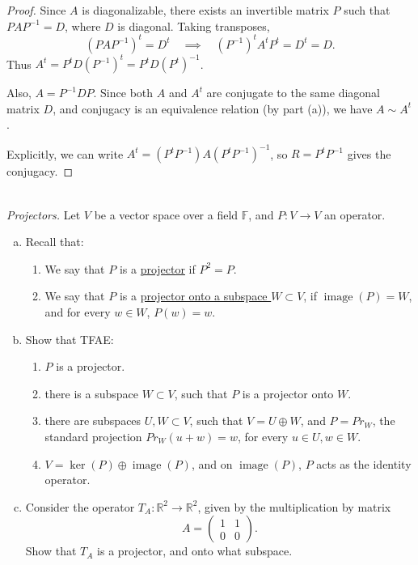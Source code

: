 \documentclass{article}
\def\rr{{\mathbb R}}
\begin{document}
\begin{enumerate}[(a)]
\begin{enumerate}[1.]
            \begin{proof}
                Since $A$ is diagonalizable, there exists an invertible matrix $P$ such that $P A P^{-1} = D$, where $D$ is diagonal. Taking transposes,
                \[
                    (P A P^{-1})^t = D^t \quad \implies \quad (P^{-1})^t A^t P^t = D^t = D.
                \]
                Thus $A^t = P^t D (P^{-1})^t = P^t D (P^t)^{-1}$. 
                
                Also, $A = P^{-1} D P$. Since both $A$ and $A^t$ are conjugate to the same diagonal matrix $D$, and conjugacy is an equivalence relation (by part (a)), we have $A \sim A^t$.
                
                Explicitly, we can write $A^t = (P^t P^{-1}) A (P^t P^{-1})^{-1}$, so $R = P^t P^{-1}$ gives the conjugacy.
            \end{proof}
        \end{enumerate}
\end{enumerate}



\begin{problem} \\ 
    \textit{Projectors.} Let $V$ be a vector space over a field $\mathbb{F}$, and $P : V \to V$ an operator.
    \begin{enumerate}[(a)]
        \item Recall that:
        \begin{enumerate}[1.]
            \item We say that $P$ is a \underline{projector} if $P^2 = P$.
            \item We say that $P$ is a \underline{projector onto a subspace $W \subset V$}, if $\operatorname{image}(P) = W$, and for every $w \in W$, $P(w) = w$.
        \end{enumerate}
        \item Show that TFAE:
        \begin{enumerate}[1.]
            \item $P$ is a projector.
            \item there is a subspace $W \subset V$, such that $P$ is a projector onto $W$.
            \item there are subspaces $U,W \subset V$, such that $V = U \oplus W$, and $P = Pr_W$, the standard projection $Pr_W(u + w) = w$, for every $u \in U, w \in W$.
            \item $V = \ker(P) \oplus \operatorname{image}(P)$, and on $\operatorname{image}(P)$, $P$ acts as the identity operator.
        \end{enumerate}
        \item Consider the operator $T_A : \rr^2 \to \rr^2$, given by the multiplication by matrix
        \[
            A = \begin{pmatrix}
                1 & 1 \\
                0 & 0
            \end{pmatrix}.
        \]
        Show that $T_A$ is a projector, and onto what subspace.
    \end{enumerate}
\end{problem}
\end{document}
